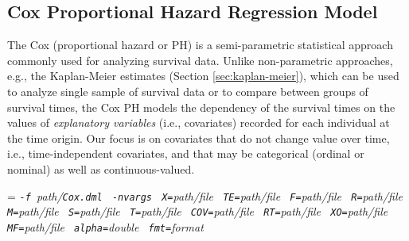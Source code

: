 \begin{comment}

 Licensed to the Apache Software Foundation (ASF) under one
 or more contributor license agreements.  See the NOTICE file
 distributed with this work for additional information
 regarding copyright ownership.  The ASF licenses this file
 to you under the Apache License, Version 2.0 (the
 "License"); you may not use this file except in compliance
 with the License.  You may obtain a copy of the License at

   http://www.apache.org/licenses/LICENSE-2.0

 Unless required by applicable law or agreed to in writing,
 software distributed under the License is distributed on an
 "AS IS" BASIS, WITHOUT WARRANTIES OR CONDITIONS OF ANY
 KIND, either express or implied.  See the License for the
 specific language governing permissions and limitations
 under the License.

\end{comment}

\subsection{Cox Proportional Hazard Regression Model}

\smallskip


The Cox (proportional hazard or PH) is a semi-parametric statistical approach commonly used for analyzing survival data.
Unlike non-parametric approaches, e.g., the Kaplan-Meier estimates (Section \ref{sec:kaplan-meier}), which can be used to analyze single sample of survival data or to compare between groups of survival times, the Cox PH models the dependency of the survival times on the values of {\it explanatory variables} (i.e., covariates) recorded for each individual at the time origin. Our focus is on covariates that do not change value over time, i.e., time-independent covariates, and that may be categorical (ordinal or nominal) as well as continuous-valued. \\  


\smallskip
{}
\smallskip

{\hangindent=\parindent\noindent\it%
{\tt{}-f }path/\/{\tt{}Cox.dml}
{\tt{} -nvargs}
{\tt{} X=}path/file
{\tt{} TE=}path/file
{\tt{} F=}path/file
{\tt{} R=}path/file
{\tt{} M=}path/file
{\tt{} S=}path/file
{\tt{} T=}path/file
{\tt{} COV=}path/file
{\tt{} RT=}path/file
{\tt{} XO=}path/file
{\tt{} MF=}path/file
{\tt{} alpha=}double
{\tt{} fmt=}format

}

